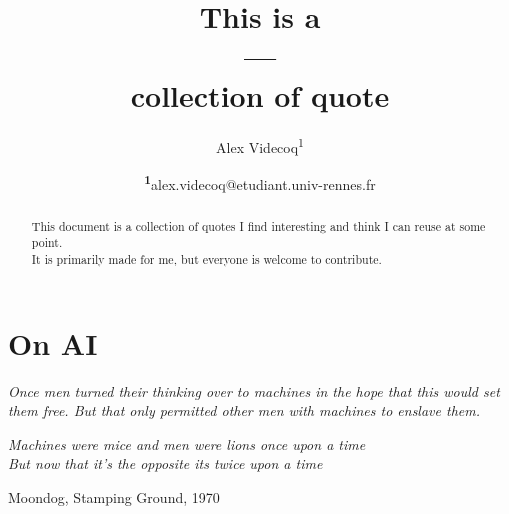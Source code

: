 \documentclass[
	a4paper, %
	12pt, %
	unnumberedsections, %
	twoside, %
    xcolor = {dvipsnames}
]{class}
\title{This is a\\---\\collection of quote} %
\author{%
	Alex Videcoq\textsuperscript{1}
}
\date{\footnotesize\textsuperscript{\textbf{1}}alex.videcoq@etudiant.univ-rennes.fr}
\begin{document}
\maketitle

\begin{abstract}
    \noindent This document is a collection of quotes I find interesting and think I can reuse at some point.\\
    It is primarily made for me, but everyone is welcome to contribute.
\end{abstract}

\section{On AI}
\textit{Once men turned their thinking over to machines in the hope that this would set them free.
But that only permitted other men with machines to enslave them.}\par
\cite{herbert_dune_1965} \par
\noindent
\textit{Machines were mice and men were lions once upon a time\\
But now that it's the opposite its twice upon a time}\par
Moondog, Stamping Ground, 1970

\pagebreak
\printbibliography

\end{document}
